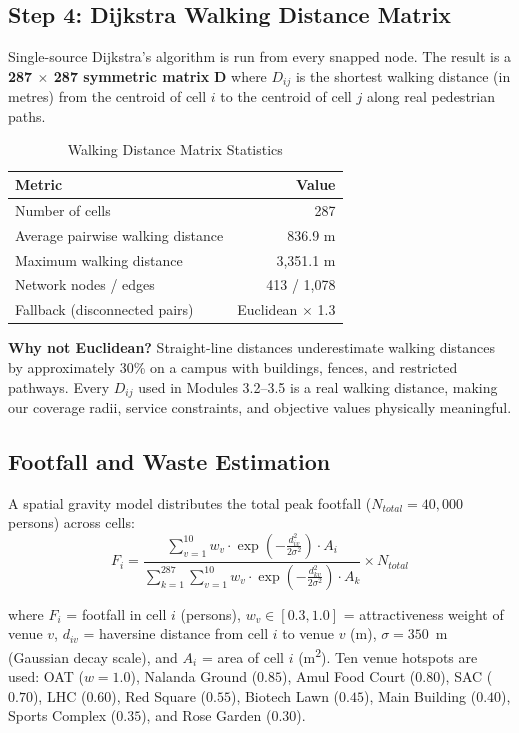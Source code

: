 \documentclass[11pt,a4paper]{article}
\begin{document}
\subsection{Step 4: Dijkstra Walking Distance Matrix}

Single-source Dijkstra's algorithm is run from every snapped node. The result is a \textbf{287 $\times$ 287 symmetric matrix} $\mathbf{D}$ where $D_{ij}$ is the shortest walking distance (in metres) from the centroid of cell $i$ to the centroid of cell $j$ along real pedestrian paths.

\begin{table}[H]
\centering
\caption{Walking Distance Matrix Statistics}
\label{tab:dist_stats}
\begin{tabular}{lr}
\toprule
\textbf{Metric} & \textbf{Value} \\ \midrule
Number of cells & 287 \\
Average pairwise walking distance & 836.9 m \\
Maximum walking distance & 3,351.1 m \\
Network nodes / edges & 413 / 1,078 \\
Fallback (disconnected pairs) & Euclidean $\times$ 1.3 \\
\bottomrule
\end{tabular}
\end{table}

\textbf{Why not Euclidean?} Straight-line distances underestimate walking distances by approximately 30\% on a campus with buildings, fences, and restricted pathways. Every $D_{ij}$ used in Modules 3.2--3.5 is a real walking distance, making our coverage radii, service constraints, and objective values physically meaningful.

\subsection{Footfall and Waste Estimation}

A spatial gravity model distributes the total peak footfall ($N_{total} = 40{,}000$ persons) across cells:
\begin{equation}
    F_i = \frac{\displaystyle\sum_{v=1}^{10} w_v \cdot \exp\!\left(-\frac{d_{iv}^2}{2\sigma^2}\right) \cdot A_i}{\displaystyle\sum_{k=1}^{287} \sum_{v=1}^{10} w_v \cdot \exp\!\left(-\frac{d_{kv}^2}{2\sigma^2}\right) \cdot A_k} \times N_{total}
\end{equation}

\noindent where $F_i$ = footfall in cell $i$ (persons), $w_v \in [0.3, 1.0]$ = attractiveness weight of venue $v$, $d_{iv}$ = haversine distance from cell $i$ to venue $v$ (m), $\sigma = 350$~m (Gaussian decay scale), and $A_i$ = area of cell $i$ (m\textsuperscript{2}). Ten venue hotspots are used: OAT ($w=1.0$), Nalanda Ground ($0.85$), Amul Food Court ($0.80$), SAC ($0.70$), LHC ($0.60$), Red Square ($0.55$), Biotech Lawn ($0.45$), Main Building ($0.40$), Sports Complex ($0.35$), and Rose Garden ($0.30$).
\end{document}
